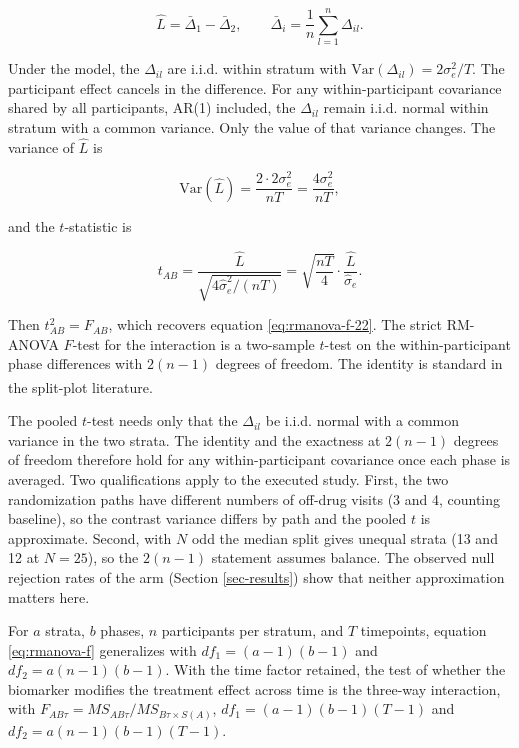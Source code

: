 \documentclass[
  11pt,
]{article}
\begin{document}
\begin{equation}
\hat L = \bar\Delta_1 - \bar\Delta_2,
\qquad
\bar\Delta_i = \frac{1}{n}\sum_{l=1}^n \Delta_{il}.
\label{eq:rmanova-Delta}
\end{equation}

Under the model, the \(\Delta_{il}\) are i.i.d. within stratum with
\(\mathrm{Var}(\Delta_{il}) = 2\sigma_e^2 / T\). The participant
effect cancels in the difference. For any within-participant
covariance shared by all participants, AR(1) included, the
\(\Delta_{il}\) remain i.i.d. normal within stratum with a common
variance. Only the value of that variance changes. The variance of
\(\hat L\) is

\begin{equation}
\mathrm{Var}(\hat L) = \frac{2 \cdot 2\sigma_e^2}{nT}
= \frac{4\sigma_e^2}{nT} ,
\label{eq:rmanova-varL}
\end{equation}

and the \(t\)-statistic is

\begin{equation}
t_{AB} = \frac{\hat L}{\sqrt{4\hat\sigma_e^2 / (nT)}}
= \sqrt{\frac{nT}{4}} \cdot \frac{\hat L}{\hat\sigma_e} .
\label{eq:rmanova-t}
\end{equation}

Then \(t_{AB}^2 = F_{AB}\), which recovers equation
\eqref{eq:rmanova-f-22}. The strict RM-ANOVA \(F\)-test for the
interaction is a two-sample \(t\)-test on the within-participant
phase differences with \(2(n-1)\) degrees of freedom. The identity is
standard in the split-plot literature\textsuperscript{}.

The pooled \(t\)-test needs only that the \(\Delta_{il}\) be i.i.d.
normal with a common variance in the two strata. The identity and
the exactness at \(2(n-1)\) degrees of freedom therefore hold for any
within-participant covariance once each phase is averaged. Two
qualifications apply to the executed study. First, the two
randomization paths have different numbers of off-drug visits (3
and 4, counting baseline), so the contrast variance differs by
path and the pooled \(t\) is approximate. Second, with \(N\) odd the
median split gives unequal strata (13 and 12 at \(N = 25\)), so the
\(2(n-1)\) statement assumes balance. The observed null rejection
rates of the arm (Section \ref{sec-results}) show that neither
approximation matters here.

For \(a\) strata, \(b\) phases, \(n\) participants per stratum, and \(T\)
timepoints, equation \eqref{eq:rmanova-f} generalizes with
\(df_1 = (a-1)(b-1)\) and \(df_2 = a(n-1)(b-1)\). With the time factor
retained, the test of whether the biomarker modifies the treatment
effect across time is the three-way interaction, with
\(F_{AB\tau} = MS_{AB\tau} / MS_{B\tau \times S(A)}\),
\(df_1 = (a-1)(b-1)(T-1)\) and \(df_2 = a(n-1)(b-1)(T-1)\).
\end{document}
